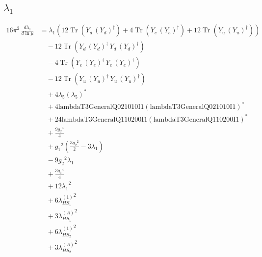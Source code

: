 \documentclass[10pt,a4paper]{article}
\begin{document}
\subsection*{$\lambda_1$}
\begin{align*}
16\pi^2\,\frac{d \lambda_1}{d\ln\mu} &={\lambda_1} (12 \operatorname{Tr}\!\left({Y_d}\,\left({Y_d}\right)^{\dagger}\right)+4 \operatorname{Tr}\!\left({Y_e}\,\left({Y_e}\right)^{\dagger}\right)+12 \operatorname{Tr}\!\left({Y_u}\,\left({Y_u}\right)^{\dagger}\right)) \\
&\quad -12 \operatorname{Tr}\!\left({Y_d}\,\left({Y_d}\right)^{\dagger}\,{Y_d}\,\left({Y_d}\right)^{\dagger}\right) \\
&\quad -4 \operatorname{Tr}\!\left({Y_e}\,\left({Y_e}\right)^{\dagger}\,{Y_e}\,\left({Y_e}\right)^{\dagger}\right) \\
&\quad -12 \operatorname{Tr}\!\left({Y_u}\,\left({Y_u}\right)^{\dagger}\,{Y_u}\,\left({Y_u}\right)^{\dagger}\right) \\
&\quad +4 {\lambda_5} \left({\lambda_5}\right)^{*} \\
&\quad +4 \text{lambdaT3GeneralQ021010I1} \left(\text{lambdaT3GeneralQ021010I1}\right)^{*} \\
&\quad +24 \text{lambdaT3GeneralQ110200I1} \left(\text{lambdaT3GeneralQ110200I1}\right)^{*} \\
&\quad +\frac{9 {g_2}^4}{4} \\
&\quad +{g_1}^2 \left(\frac{3 {g_2}^2}{2}-3 {\lambda_1}\right) \\
&\quad -9 {g_2}^2 {\lambda_1} \\
&\quad +\frac{3 {g_1}^4}{4} \\
&\quad +12 {\lambda_1}^2 \\
&\quad +6 {\lambda_{HS_1}^{(1)}}^2 \\
&\quad +3 {\lambda_{HS_1}^{(A)}}^2 \\
&\quad +6 {\lambda_{HS_2}^{(1)}}^2 \\
&\quad +3 {\lambda_{HS_2}^{(A)}}^2 \\
\end{align*}
\end{document}
